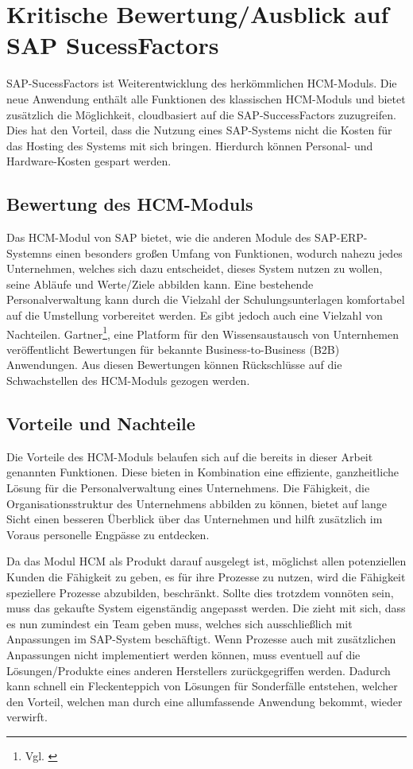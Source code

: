 
\section{Kritische Bewertung/Ausblick auf SAP SucessFactors} 
\label{sec:bewertungundausblick}
SAP-SucessFactors ist Weiterentwicklung des herkömmlichen HCM-Moduls.
Die neue Anwendung enthält alle Funktionen des klassischen HCM-Moduls und bietet zusätzlich die Möglichkeit, cloudbasiert auf die SAP-SuccessFactors zuzugreifen.
Dies hat den Vorteil, dass die Nutzung eines SAP-Systems nicht die Kosten für das Hosting des Systems mit sich bringen.
Hierdurch können Personal- und Hardware-Kosten gespart werden.

\subsection{Bewertung des HCM-Moduls}
Das HCM-Modul von SAP bietet, wie die anderen Module des SAP-ERP-Systemns einen besonders großen Umfang von Funktionen, wodurch nahezu jedes Unternehmen, welches sich dazu entscheidet, dieses System nutzen zu wollen,
seine Abläufe und Werte/Ziele abbilden kann.
Eine bestehende Personalverwaltung kann durch die Vielzahl der Schulungsunterlagen komfortabel auf die Umstellung vorbereitet werden.
Es gibt jedoch auch eine Vielzahl von Nachteilen. Gartner\footnote{Vgl. \cite{Gartner2024}}, eine Platform für den Wissensaustausch von Unternhemen veröffentlicht Bewertungen für bekannte Business-to-Business (B2B) Anwendungen.
Aus diesen Bewertungen können Rückschlüsse auf die Schwachstellen des HCM-Moduls gezogen werden.

\subsection{Vorteile und Nachteile}
Die Vorteile des HCM-Moduls belaufen sich auf die bereits in dieser Arbeit genannten Funktionen.
Diese bieten in Kombination eine effiziente, ganzheitliche Lösung für die Personalverwaltung eines Unternehmens.
Die Fähigkeit, die Organisationsstruktur des Unternehmens abbilden zu können, bietet auf lange Sicht einen besseren Überblick über das Unternehmen und hilft zusätzlich im Voraus personelle Engpässe zu entdecken.

Da das Modul HCM als Produkt darauf ausgelegt ist, möglichst allen potenziellen Kunden die Fähigkeit zu geben, es für ihre Prozesse zu nutzen, wird die Fähigkeit speziellere Prozesse abzubilden, beschränkt.
Sollte dies trotzdem vonnöten sein, muss das gekaufte System eigenständig angepasst werden.
Die zieht mit sich, dass es nun zumindest ein Team geben muss, welches sich ausschließlich mit Anpassungen im SAP-System beschäftigt.
Wenn Prozesse auch mit zusätzlichen Anpassungen nicht implementiert werden können, muss eventuell auf die Lösungen/Produkte eines anderen Herstellers zurückgegriffen werden.
Dadurch kann schnell ein Fleckenteppich von Lösungen für Sonderfälle entstehen, welcher den Vorteil, welchen man durch eine allumfassende Anwendung bekommt,
wieder verwirft.

